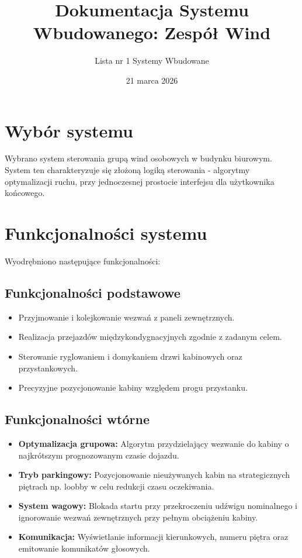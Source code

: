 \documentclass[12pt,a4paper]{article}
\begin{document}
\title{Dokumentacja Systemu Wbudowanego: Zespół Wind}
\author{Lista nr 1 Systemy Wbudowane }
\date{21 marca 2026}
\maketitle

\section{Wybór systemu }
Wybrano system sterowania grupą wind osobowych w budynku biurowym. System ten charakteryzuje się złożoną logiką sterowania - algorytmy optymalizacji ruchu, przy jednoczesnej prostocie interfejsu dla użytkownika końcowego. 

\section{Funkcjonalności systemu}
Wyodrębniono następujące funkcjonalności:

\subsection{Funkcjonalności podstawowe}
\begin{itemize}[noitemsep]
    \item Przyjmowanie i kolejkowanie wezwań z paneli zewnętrznych.
    \item Realizacja przejazdów międzykondygnacyjnych zgodnie z zadanym celem.
    \item Sterowanie ryglowaniem i domykaniem drzwi kabinowych oraz przystankowych.
    \item Precyzyjne pozycjonowanie kabiny względem progu przystanku.
\end{itemize}

\subsection{Funkcjonalności wtórne}
\begin{itemize}[noitemsep]
    \item \textbf{Optymalizacja grupowa:} Algorytm przydzielający wezwanie do kabiny o najkrótszym prognozowanym czasie dojazdu.
    \item \textbf{Tryb parkingowy:} Pozycjonowanie nieużywanych kabin na strategicznych piętrach np. loobby w celu redukcji czasu oczekiwania.
    \item \textbf{System wagowy:} Blokada startu przy przekroczeniu udźwigu nominalnego i ignorowanie wezwań zewnętrznych przy pełnym obciążeniu kabiny.
    \item \textbf{Komunikacja:} Wyświetlanie informacji kierunkowych, numeru piętra oraz emitowanie komunikatów głosowych.
\end{itemize}
\end{document}
